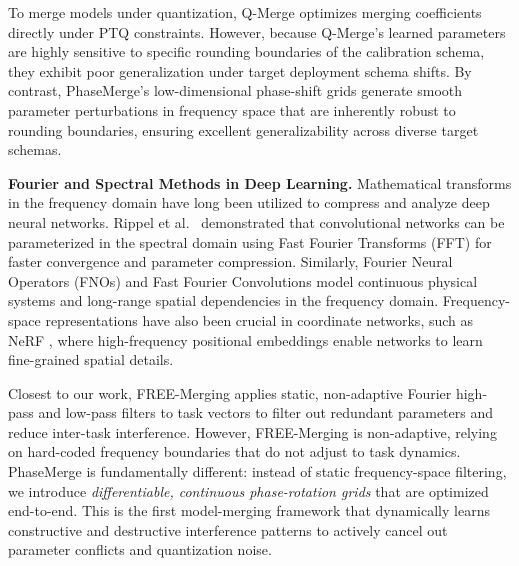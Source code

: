 To merge models under quantization, Q-Merge \cite{qmerge2024} optimizes merging coefficients directly under PTQ constraints. However, because Q-Merge's learned parameters are highly sensitive to specific rounding boundaries of the calibration schema, they exhibit poor generalization under target deployment schema shifts. By contrast, PhaseMerge's low-dimensional phase-shift grids generate smooth parameter perturbations in frequency space that are inherently robust to rounding boundaries, ensuring excellent generalizability across diverse target schemas.

\textbf{Fourier and Spectral Methods in Deep Learning.} Mathematical transforms in the frequency domain have long been utilized to compress and analyze deep neural networks. Rippel et al.\ \cite{rippel2015spectral} demonstrated that convolutional networks can be parameterized in the spectral domain using Fast Fourier Transforms (FFT) for faster convergence and parameter compression. Similarly, Fourier Neural Operators (FNOs) \cite{li2020fourier} and Fast Fourier Convolutions \cite{chi2020fast} model continuous physical systems and long-range spatial dependencies in the frequency domain. Frequency-space representations have also been crucial in coordinate networks, such as NeRF \cite{mildenhall2020nerf, tancik2020fourier}, where high-frequency positional embeddings enable networks to learn fine-grained spatial details.

Closest to our work, FREE-Merging \cite{freemerge2024} applies static, non-adaptive Fourier high-pass and low-pass filters to task vectors to filter out redundant parameters and reduce inter-task interference. However, FREE-Merging is non-adaptive, relying on hard-coded frequency boundaries that do not adjust to task dynamics. PhaseMerge is fundamentally different: instead of static frequency-space filtering, we introduce \emph{differentiable, continuous phase-rotation grids} that are optimized end-to-end. This is the first model-merging framework that dynamically learns constructive and destructive interference patterns to actively cancel out parameter conflicts and quantization noise.
